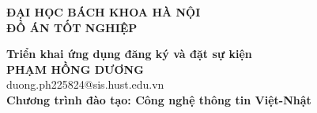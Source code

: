 \documentclass[DoAn.tex]{subfiles}
\begin{document}
\begin{titlepage}
\thispagestyle{empty}
\begin{center}

{\textbf{\large{ĐẠI HỌC BÁCH KHOA HÀ NỘI}}}\\[4cm]

{\textbf{\huge{ ĐỒ ÁN TỐT NGHIỆP}}}\\[1cm]
{\textbf{\Large{Triển khai ứng dụng đăng ký và đặt sự kiện}}\\[1cm]

{\textbf{\large{PHẠM HỒNG DƯƠNG}}}\\
{\large{duong.ph225824@sis.hust.edu.vn}}\\[0.5cm]

{\textbf{\large{Chương trình đào tạo: Công nghệ thông tin Việt-Nhật
}}}\\

\vspace{4cm}
\begin{table}[H]
\centering
{}
\end{table}}
\end{center}



\end{titlepage}
\end{document}
